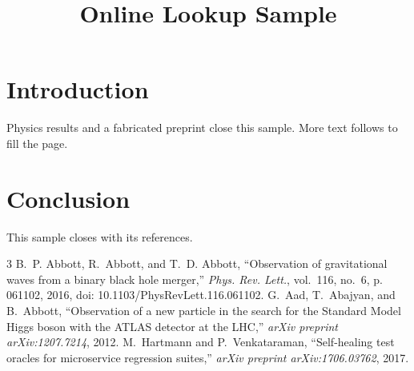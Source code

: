 \documentclass[10pt,conference]{IEEEtran}
\begin{document}
\title{Online Lookup Sample}
\author{}
\maketitle
\section{Introduction}
Physics results \cite{ligo, atlas} and a fabricated preprint \cite{fake} close this sample. More text follows to fill the page.
\section{Conclusion}
This sample closes with its references.
\begin{thebibliography}{3}
B.~P. Abbott, R.~Abbott, and T.~D. Abbott, ``Observation of gravitational waves from a binary black hole merger,'' \emph{Phys. Rev. Lett.}, vol.~116, no.~6, p. 061102, 2016, doi: 10.1103/PhysRevLett.116.061102.
G.~Aad, T.~Abajyan, and B.~Abbott, ``Observation of a new particle in the search for the Standard Model Higgs boson with the ATLAS detector at the LHC,'' \emph{arXiv preprint arXiv:1207.7214}, 2012.
M.~Hartmann and P.~Venkataraman, ``Self-healing test oracles for microservice regression suites,'' \emph{arXiv preprint arXiv:1706.03762}, 2017.
\end{thebibliography}
\end{document}
